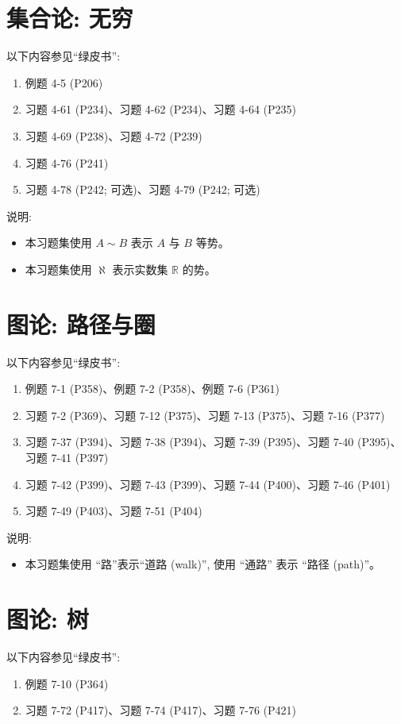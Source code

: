 \documentclass{article}
\begin{document}
\section{集合论: 无穷}

以下内容参见``绿皮书'':
\begin{enumerate}[(1)]
  \item 例题 4-5 (P206)
  \item 习题 4-61 (P234)、习题 4-62 (P234)、习题 4-64 (P235)
  \item 习题 4-69 (P238)、习题 4-72 (P239)
  \item 习题 4-76 (P241)
  \item 习题 4-78 (P242; 可选)、习题 4-79 (P242; 可选)
\end{enumerate}

说明:
\begin{itemize}
  \item 本习题集使用 $A \sim B$ 表示 $A$ 与 $B$ 等势。
  \item 本习题集使用 $\aleph$ 表示实数集 $\mathbb{R}$ 的势。
\end{itemize}
\section{图论: 路径与圈}

以下内容参见``绿皮书'':
\begin{enumerate}[(1)]
  \item 例题 7-1 (P358)、例题 7-2 (P358)、例题 7-6 (P361)
  \item 习题 7-2 (P369)、习题 7-12 (P375)、习题 7-13 (P375)、习题 7-16 (P377)
  \item 习题 7-37 (P394)、习题 7-38 (P394)、习题 7-39 (P395)、习题 7-40 (P395)、
  习题 7-41 (P397)
  \item 习题 7-42 (P399)、习题 7-43 (P399)、习题 7-44 (P400)、习题 7-46 (P401)
  \item 习题 7-49 (P403)、习题 7-51 (P404)
\end{enumerate}

说明:
\begin{itemize}
  \item 本习题集使用 ``路''表示``道路 (walk)'', 使用 ``通路'' 表示 ``路径 (path)''。
\end{itemize}
\section{图论: 树}

以下内容参见``绿皮书'':
\begin{enumerate}[(1)]
  \item 例题 7-10 (P364)
  \item 习题 7-72 (P417)、习题 7-74 (P417)、习题 7-76 (P421)
\end{enumerate}
\end{document}
